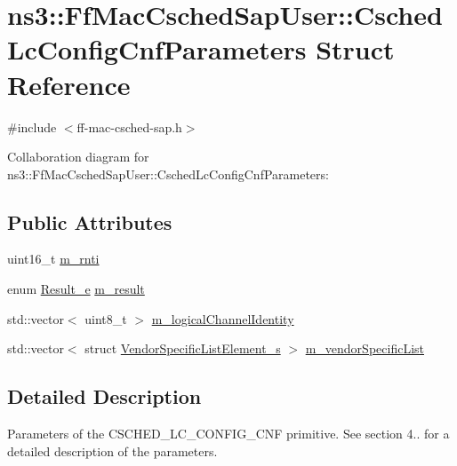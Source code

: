 \hypertarget{structns3_1_1FfMacCschedSapUser_1_1CschedLcConfigCnfParameters}{}\section{ns3\+:\+:Ff\+Mac\+Csched\+Sap\+User\+:\+:Csched\+Lc\+Config\+Cnf\+Parameters Struct Reference}
\label{structns3_1_1FfMacCschedSapUser_1_1CschedLcConfigCnfParameters}


{\ttfamily \#include $<$ff-\/mac-\/csched-\/sap.\+h$>$}



Collaboration diagram for ns3\+:\+:Ff\+Mac\+Csched\+Sap\+User\+:\+:Csched\+Lc\+Config\+Cnf\+Parameters\+:
\subsection*{Public Attributes}
\begin{DoxyCompactItemize}
\item 
uint16\+\_\+t \hyperlink{structns3_1_1FfMacCschedSapUser_1_1CschedLcConfigCnfParameters_aa93ab0581b26cc678979b2f2613b49d1}{m\+\_\+rnti}
\item 
enum \hyperlink{namespacens3_a7acf2b7f9e0781dfe43a6bc54d6ecd07}{Result\+\_\+e} \hyperlink{structns3_1_1FfMacCschedSapUser_1_1CschedLcConfigCnfParameters_acaf87fc1dc7b3a4c404a4c4543d5da51}{m\+\_\+result}
\item 
std\+::vector$<$ uint8\+\_\+t $>$ \hyperlink{structns3_1_1FfMacCschedSapUser_1_1CschedLcConfigCnfParameters_ac2afd44656054904639db87c600079d4}{m\+\_\+logical\+Channel\+Identity}
\item 
std\+::vector$<$ struct \hyperlink{structns3_1_1VendorSpecificListElement__s}{Vendor\+Specific\+List\+Element\+\_\+s} $>$ \hyperlink{structns3_1_1FfMacCschedSapUser_1_1CschedLcConfigCnfParameters_a930c6d902697524733c123f0a749c8f1}{m\+\_\+vendor\+Specific\+List}
\end{DoxyCompactItemize}


\subsection{Detailed Description}
Parameters of the C\+S\+C\+H\+E\+D\+\_\+\+L\+C\+\_\+\+C\+O\+N\+F\+I\+G\+\_\+\+C\+NF primitive. See section 4.. for a detailed description of the parameters. 

